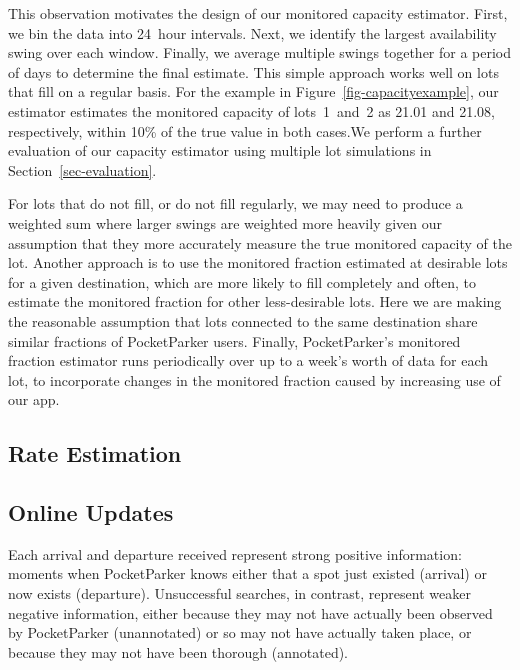 This observation motivates the design of our monitored capacity estimator.
First, we bin the data into 24~hour intervals. Next, we identify the largest
availability swing over each window. Finally, we average multiple swings
together for a period of days to determine the final estimate. This simple
approach works well on lots that fill on a regular basis. For the example in
Figure~\ref{fig-capacityexample}, our estimator estimates the monitored
capacity of lots~1~and~2 as 21.01 and 21.08, respectively, within 10\% of the
true value in both cases.We perform a further evaluation of our capacity
estimator using multiple lot simulations in Section~\ref{sec-evaluation}.

For lots that do not fill, or do not fill regularly, we may need to produce a
weighted sum where larger swings are weighted more heavily given our
assumption that they more accurately measure the true monitored capacity of
the lot. Another approach is to use the monitored fraction estimated at
desirable lots for a given destination, which are more likely to fill
completely and often, to estimate the monitored fraction for other
less-desirable lots. Here we are making the reasonable assumption that lots
connected to the same destination share similar fractions of PocketParker
users. Finally, PocketParker's monitored fraction estimator runs periodically
over up to a week's worth of data for each lot, to incorporate changes in the
monitored fraction caused by increasing use of our app.

\subsection{Rate Estimation}
\label{subsec-rates}

\subsection{Online Updates}
\label{subsec-online}

Each arrival and departure received represent strong positive information:
moments when PocketParker knows either that a spot just existed (arrival) or
now exists (departure). Unsuccessful searches, in contrast, represent weaker
negative information, either because they may not have actually been observed
by PocketParker (unannotated) or so may not have actually taken place, or
because they may not have been thorough (annotated).
